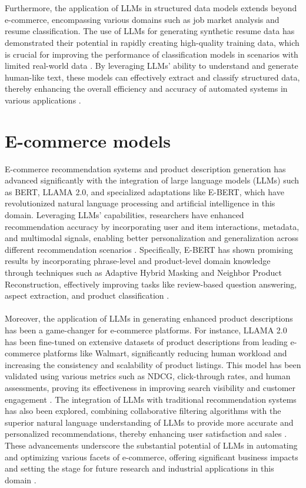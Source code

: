 \\\\
Furthermore, the application of LLMs in structured data models extends beyond e-commerce, encompassing various domains such as job market analysis and resume classification. The use of LLMs for generating synthetic resume data has demonstrated their potential in rapidly creating high-quality training data, which is crucial for improving the performance of classification models in scenarios with limited real-world data \cite{skondras2023generating}. By leveraging LLMs' ability to understand and generate human-like text, these models can effectively extract and classify structured data, thereby enhancing the overall efficiency and accuracy of automated systems in various applications \cite{tang2024strucbench}.

\section{E-commerce models}
E-commerce recommendation systems and product description generation has advanced significantly with the integration of large language models (LLMs) such as BERT, LLAMA 2.0, and specialized adaptations like E-BERT, which have revolutionized natural language processing and artificial intelligence in this domain. Leveraging LLMs' capabilities, researchers have enhanced recommendation accuracy by incorporating user and item interactions, metadata, and multimodal signals, enabling better personalization and generalization across different recommendation scenarios \cite{xu2024emerging}. Specifically, E-BERT has shown promising results by incorporating phrase-level and product-level domain knowledge through techniques such as Adaptive Hybrid Masking and Neighbor Product Reconstruction, effectively improving tasks like review-based question answering, aspect extraction, and product classification \cite{zhang2021ebert}.
\\\\
Moreover, the application of LLMs in generating enhanced product descriptions has been a game-changer for e-commerce platforms. For instance, LLAMA 2.0 has been fine-tuned on extensive datasets of product descriptions from leading e-commerce platforms like Walmart, significantly reducing human workload and increasing the consistency and scalability of product listings. This model has been validated using various metrics such as NDCG, click-through rates, and human assessments, proving its effectiveness in improving search visibility and customer engagement \cite{zhou2023leveraging}. The integration of LLMs with traditional recommendation systems has also been explored, combining collaborative filtering algorithms with the superior natural language understanding of LLMs to provide more accurate and personalized recommendations, thereby enhancing user satisfaction and sales \cite{xu2024emerging}. These advancements underscore the substantial potential of LLMs in automating and optimizing various facets of e-commerce, offering significant business impacts and setting the stage for future research and industrial applications in this domain \cite{zhou2023leveraging}.


